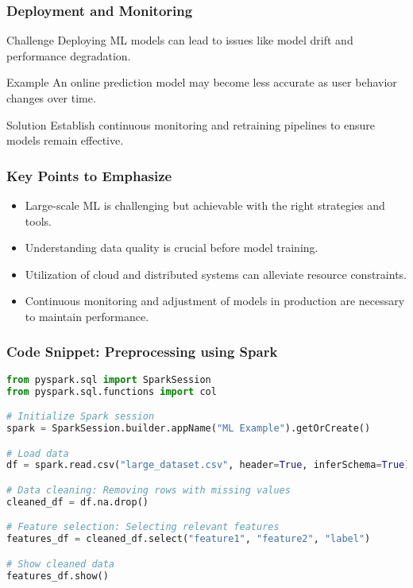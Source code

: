 \documentclass[aspectratio=169]{beamer}
\begin{document}
\begin{frame}[fragile]
    \frametitle{Deployment and Monitoring}
    \begin{block}{Challenge}
        Deploying ML models can lead to issues like model drift and performance degradation.
    \end{block}
    \begin{block}{Example}
        An online prediction model may become less accurate as user behavior changes over time.
    \end{block}
    \begin{block}{Solution}
        Establish continuous monitoring and retraining pipelines to ensure models remain effective.
    \end{block}
\end{frame}

\begin{frame}[fragile]
    \frametitle{Key Points to Emphasize}
    \begin{itemize}
        \item Large-scale ML is challenging but achievable with the right strategies and tools.
        \item Understanding data quality is crucial before model training.
        \item Utilization of cloud and distributed systems can alleviate resource constraints.
        \item Continuous monitoring and adjustment of models in production are necessary to maintain performance.
    \end{itemize}
\end{frame}

\begin{frame}[fragile]
    \frametitle{Code Snippet: Preprocessing using Spark}
    \begin{lstlisting}[language=Python]
from pyspark.sql import SparkSession
from pyspark.sql.functions import col

# Initialize Spark session
spark = SparkSession.builder.appName("ML Example").getOrCreate()

# Load data
df = spark.read.csv("large_dataset.csv", header=True, inferSchema=True)

# Data cleaning: Removing rows with missing values
cleaned_df = df.na.drop()

# Feature selection: Selecting relevant features
features_df = cleaned_df.select("feature1", "feature2", "label")

# Show cleaned data
features_df.show()
    \end{lstlisting}
\end{frame}
\end{document}
